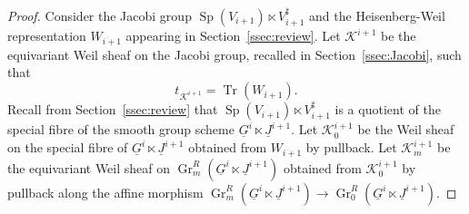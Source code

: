 \documentclass[10pt]{amsart}
\theoremstyle{plain}
\theoremstyle{definition}
\DeclareMathOperator{\Gr}{Gr}
\DeclareMathOperator{\trace}{Tr}
\newcommand{\trFrob}[1]{t_{#1}}
\newcommand{\cs}[1]{{\mathcal{#1}}}
\newcommand{\Sp}{{\operatorname{Sp}}}
\begin{document}
\begin{proof}
Consider the Jacobi group $\Sp(V_{i+1})\ltimes V_{i+1}^\sharp$ and the Heisenberg-Weil representation $W_{i+1}$ appearing in Section~\ref{ssec:review}.
Let $\cs{K}^{i+1}$ be the equivariant Weil sheaf on the Jacobi group, recalled in Section~\ref{ssec:Jacobi}, such that
\[
\trFrob{\cs{K}^{i+1}} = \trace(W_{i+1}).
\]
Recall from Section~\ref{ssec:review} that $\Sp(V_{i+1})\ltimes V_{i+1}^\sharp$ is a quotient of the special fibre of the smooth group scheme $\underline{G}^{i} \ltimes \underline{J}^{i+1}$.
Let $\cs{K}_0^{i+1}$ be the Weil sheaf on the special fibre of $\underline{G}^{i} \ltimes \underline{J}^{i+1}$ obtained from $W_{i+1}$ by pullback. 
Let $\cs{K}_m^{i+1}$ be the equivariant Weil sheaf on $\Gr^{R}_m(\underline{G}^{i} \ltimes \underline{J}^{i+1})$ obtained from $\cs{K}_0^{i+1}$ by pullback along the affine morphism
$\Gr^{R}_m(\underline{G}^{i} \ltimes \underline{J}^{i+1}) \to \Gr^{R}_0(\underline{G}^{i} \ltimes \underline{J}^{i+1})$.


\end{proof}
\end{document}
